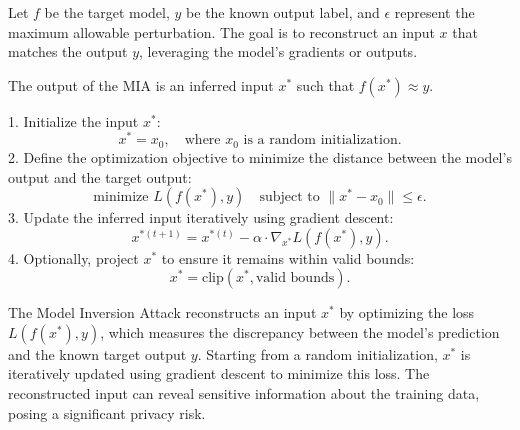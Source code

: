 Let \( f \) be the target model, \( y \) be the known output label, and \( \epsilon \) represent the maximum allowable perturbation. The goal is to reconstruct an input \( x \) that matches the output \( y \), leveraging the model's gradients or outputs.

The output of the MIA is an inferred input \( x^* \) such that \( f(x^*) \approx y \).

1. Initialize the input \( x^* \):
   \[
   x^* = x_0, \quad \text{where } x_0 \text{ is a random initialization.}
   \]
2. Define the optimization objective to minimize the distance between the model's output and the target output:
   \[
   \text{minimize } L(f(x^*), y) \quad \text{subject to } \|x^* - x_0\| \leq \epsilon.
   \]
3. Update the inferred input iteratively using gradient descent:
   \[
   x^{*(t+1)} = x^{*(t)} - \alpha \cdot \nabla_{x^*} L(f(x^*), y).
   \]
4. Optionally, project \( x^* \) to ensure it remains within valid bounds:
   \[
   x^* = \text{clip}(x^*, \text{valid bounds}).
   \]

The Model Inversion Attack reconstructs an input \( x^* \) by optimizing the loss \( L(f(x^*), y) \), which measures the discrepancy between the model's prediction and the known target output \( y \). Starting from a random initialization, \( x^* \) is iteratively updated using gradient descent to minimize this loss. The reconstructed input can reveal sensitive information about the training data, posing a significant privacy risk.
